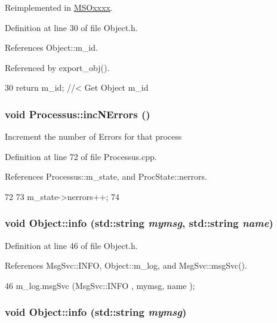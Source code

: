 Reimplemented in \hyperlink{classMSOxxxx_a0f14b23d31d8e7647184e99a89600cc3}{MSOxxxx}.

Definition at line 30 of file Object.h.

References Object::m\_\-id.

Referenced by export\_\-obj().


\begin{DoxyCode}
30 { return m_id;         } //< Get Object m_id 
\end{DoxyCode}
\hypertarget{classProcessus_abe603d0636f76db6aa6c5c60cf34c591}{
\subsubsection[{incNErrors}]{\setlength{\rightskip}{0pt plus 5cm}void Processus::incNErrors ()}}
\label{classProcessus_abe603d0636f76db6aa6c5c60cf34c591}
Increment the number of Errors for that process 

Definition at line 72 of file Processus.cpp.

References Processus::m\_\-state, and ProcState::nerrors.


\begin{DoxyCode}
72                            {
73   m_state->nerrors++;
74 }
\end{DoxyCode}
\hypertarget{classObject_a1ca123253dfd30fc28b156f521dcbdae}{
\subsubsection[{info}]{\setlength{\rightskip}{0pt plus 5cm}void Object::info (std::string {\em mymsg}, \/  std::string {\em name})}}
\label{classObject_a1ca123253dfd30fc28b156f521dcbdae}


Definition at line 46 of file Object.h.

References MsgSvc::INFO, Object::m\_\-log, and MsgSvc::msgSvc().


\begin{DoxyCode}
46 { m_log.msgSvc (MsgSvc::INFO    , mymsg, name ); }
\end{DoxyCode}
\hypertarget{classObject_a644fd329ea4cb85f54fa6846484b84a8}{
\subsubsection[{info}]{\setlength{\rightskip}{0pt plus 5cm}void Object::info (std::string {\em mymsg})}}
\label{classObject_a644fd329ea4cb85f54fa6846484b84a8}



